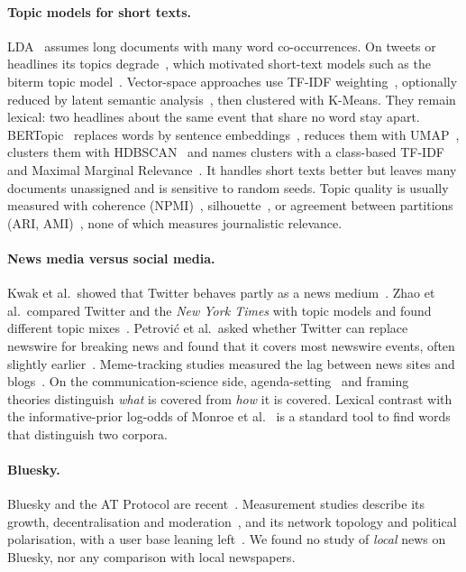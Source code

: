 \documentclass[pdflatex,sn-mathphys-num]{sn-jnl}
\begin{document}
\paragraph{Topic models for short texts.} LDA~\cite{blei2003lda} assumes long documents with many word co-occurrences. On tweets or headlines its topics degrade~\cite{hong2010twitter}, which motivated short-text models such as the biterm topic model~\cite{yan2013btm}. Vector-space approaches use TF-IDF weighting~\cite{salton1988tfidf}, optionally reduced by latent semantic analysis~\cite{deerwester1990lsa}, then clustered with K-Means. They remain lexical: two headlines about the same event that share no word stay apart. BERTopic~\cite{grootendorst2022bertopic} replaces words by sentence embeddings~\cite{reimers2019sbert,reimers2020multilingual}, reduces them with UMAP~\cite{mcinnes2018umap}, clusters them with HDBSCAN~\cite{campello2013hdbscan} and names clusters with a class-based TF-IDF and Maximal Marginal Relevance~\cite{carbonell1998mmr}. It handles short texts better but leaves many documents unassigned and is sensitive to random seeds. Topic quality is usually measured with coherence (NPMI)~\cite{bouma2009npmi,roder2015coherence}, silhouette~\cite{rousseeuw1987silhouette}, or agreement between partitions (ARI, AMI)~\cite{hubert1985ari,vinh2010ami}, none of which measures journalistic relevance.

\paragraph{News media versus social media.} Kwak et al.\ showed that Twitter behaves partly as a news medium~\cite{kwak2010twitter}. Zhao et al.\ compared Twitter and the \emph{New York Times} with topic models and found different topic mixes~\cite{zhao2011comparing}. Petrovi\'c et al.\ asked whether Twitter can replace newswire for breaking news and found that it covers most newswire events, often slightly earlier~\cite{petrovic2013newswire}. Meme-tracking studies measured the lag between news sites and blogs~\cite{leskovec2009memetracker}. On the communication-science side, agenda-setting~\cite{mccombs1972agenda} and framing~\cite{entman1993framing} theories distinguish \emph{what} is covered from \emph{how} it is covered. Lexical contrast with the informative-prior log-odds of Monroe et al.~\cite{monroe2008fightin} is a standard tool to find words that distinguish two corpora.

\paragraph{Bluesky.} Bluesky and the AT Protocol are recent~\cite{kleppmann2024bluesky}. Measurement studies describe its growth, decentralisation and moderation~\cite{balduf2024bluesky}, and its network topology and political polarisation, with a user base leaning left~\cite{quelle2024bluesky}. We found no study of \emph{local} news on Bluesky, nor any comparison with local newspapers.
\end{document}
